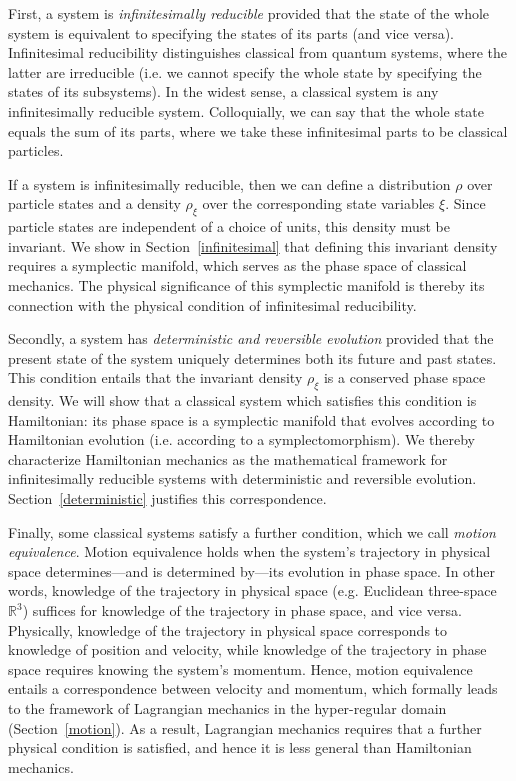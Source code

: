 \documentclass[12pt, english, twoside]{article} %
\begin{document}
First, a system is \textit{infinitesimally reducible} provided that the state of the whole system is equivalent to specifying the states of its parts (and vice versa). Infinitesimal reducibility distinguishes classical from quantum systems, where the latter are irreducible (i.e. we cannot specify the whole state by specifying the states of its subsystems). In the widest sense, a classical system is any infinitesimally reducible system. Colloquially, we can say that the whole state equals the sum of its parts, where we take these infinitesimal parts to be classical particles. 

If a system is infinitesimally reducible, then we can define a distribution $\rho$ over particle states and a density $\rho_{\xi}$ over the corresponding state variables $\xi$. Since particle states are independent of a choice of units, this density must be invariant. We show in Section~\ref{infinitesimal} that defining this invariant density requires a symplectic manifold, which serves as the phase space of classical mechanics. The physical significance of this symplectic manifold is thereby its connection with the physical condition of infinitesimal reducibility. 

Secondly, a system has \textit{deterministic and reversible evolution} provided that the present state of the system uniquely determines both its future and past states. This condition entails that the invariant density $\rho_{\xi}$ is a conserved phase space density. We will show that a classical system which satisfies this condition is Hamiltonian: its phase space is a symplectic manifold that evolves according to Hamiltonian evolution  (i.e. according to a symplectomorphism). We thereby characterize Hamiltonian mechanics as the mathematical framework for infinitesimally reducible systems with deterministic and reversible evolution. Section~\ref{deterministic} justifies this correspondence. 

Finally, some classical systems satisfy a further condition, which we call \textit{motion equivalence}. Motion equivalence holds when the system's trajectory in physical space determines---and is determined by---its evolution in phase space. In other words, knowledge of the trajectory in physical space (e.g. Euclidean three-space $\mathbb{R}^3$) suffices for knowledge of the trajectory in phase space, and vice versa. Physically, knowledge of the trajectory in physical space corresponds to knowledge of position and velocity, while knowledge of the trajectory in phase space requires knowing the system's momentum. Hence, motion equivalence entails a correspondence between velocity and momentum, which formally leads to the framework of Lagrangian mechanics in the hyper-regular domain (Section~\ref{motion}). As a result, Lagrangian mechanics requires that a further physical condition is satisfied, and hence it is less general than Hamiltonian mechanics. 
\end{document}
